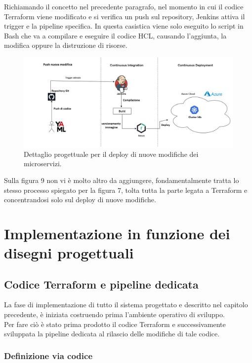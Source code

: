 \documentclass[a4paper,12pt]{report}
\begin{document}
Richiamando il concetto nel precedente paragrafo, nel momento in cui il codice Terraform viene modificato e si verifica un push sul repository, Jenkins attiva il trigger e la pipeline specifica. In questa casistica viene solo eseguito lo script in Bash che va a compilare e eseguire il codice HCL, causando l'aggiunta, la modifica oppure la distruzione di risorse.\\

\begin{figure}[h]
	\includegraphics[width=1.0\textwidth]{push_modifica}
    \caption{Dettaglio progettuale per il deploy di nuove modifiche dei microservizi.}
    \label{fig:push_modifica}
\end{figure}

Sulla figura 9 non vi è molto altro da aggiungere, fondamentalmente tratta lo stesso processo spiegato per la figura 7, tolta tutta la parte legata a Terraform e concentrandosi solo sul deploy di nuove modifiche.

\chapter{Implementazione in funzione dei disegni progettuali}
\section{Codice Terraform e pipeline dedicata}
La fase di implementazione di tutto il sistema progettato e descritto nel capitolo precedente, è iniziata costruendo prima l'ambiente operativo di sviluppo. \\
Per fare ciò è stato prima prodotto il codice Terraform e successivamente sviluppata la pipeline dedicata al rilascio delle modifiche di tale codice.\\

\subsection{Definizione via codice}
\end{document}
